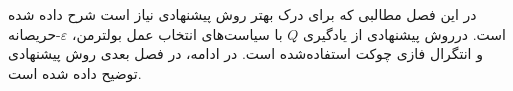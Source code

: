 در این فصل مطالبی که برای درک بهتر روش پیشنهادی نیاز است شرح داده شده است. درروش پیشنهادی از یادگیری $Q$ با سیاست‌های انتخاب عمل بولترمن، $\varepsilon$-حریصانه و انتگرال فازی چوکت استفاده‌شده است. در ادامه، در فصل بعدی روش پیشنهادی توضیح داده شده است.
